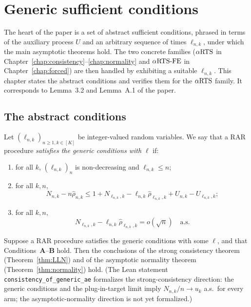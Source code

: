 \chapter{Generic sufficient conditions}
\label{chap:generic}

The heart of the paper is a set of abstract sufficient conditions, phrased in
terms of the auxiliary process $U$ and an arbitrary sequence of times
$\ell_{n,k}$, under which the main asymptotic theorems hold. The two concrete
families ($\alpha\text{RTS}$ in Chapter~\ref{chap:consistency}--\ref{chap:normality} and
$\alpha\text{RTS-FE}$ in Chapter~\ref{chap:forced}) are then handled by exhibiting a suitable
$\ell_{n,k}$. This chapter states the abstract conditions and verifies them for
the $\alpha\text{RTS}$ family. It corresponds to Lemma~3.2 and Lemma~A.1 of the paper.

\section{The abstract conditions}
\label{sec:generic_conditions}

\begin{definition}\label{def:generic_cond}
Let $(\ell_{n,k})_{n\ge1, k\in[K]}$ be integer-valued random variables. We say
that a RAR procedure \emph{satisfies the generic conditions with $\ell$} if:
\begin{enumerate}
  \item[(i)] for all $k$, $(\ell_{n,k})_n$ is non-decreasing and $\ell_{n,k}\le n$;
  \item[(ii)] for all $k,n$,
        \begin{equation}\label{eq:generic_ineq}
          N_{n,k} - n\hat{\rho}_{n,k}
          \le 1 + N_{\ell_{n,k},k} - \ell_{n,k}\hat{\rho}_{\ell_{n,k},k}
             + U_{n,k} - U_{\ell_{n,k},k};
        \end{equation}
  \item[(iii)] for all $k,n$,
        \begin{equation}\label{eq:generic_small}
          N_{\ell_{n,k},k} - \ell_{n,k}\hat{\rho}_{\ell_{n,k},k} = o(\sqrt n)
          \quad\text{a.s.}
        \end{equation}
\end{enumerate}
\end{definition}

\begin{theorem}\label{thm:generic_main}
Suppose a RAR procedure satisfies the generic conditions with some $\ell$, and
that Conditions~\textbf{A}--\textbf{B} hold. Then the conclusions of the strong
consistency theorem (Theorem~\ref{thm:LLN}) and of the asymptotic normality
theorem (Theorem~\ref{thm:normality}) hold. (The Lean statement
\texttt{consistency\_of\_generic\_ae} formalizes the strong-consistency direction:
the generic conditions and the plug-in-target limit imply $N_{n,k}/n \to u_k$ a.s.\ for every
arm; the asymptotic-normality direction is not yet formalized.)
\end{theorem}

